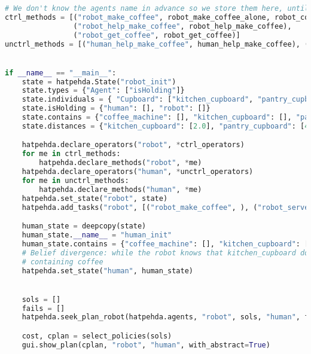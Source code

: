 \begin{lstlisting}[language=Python]
# We don't know the agents name in advance so we store them here, until we can add the proper agents
ctrl_methods = [("robot_make_coffee", robot_make_coffee_alone, robot_collaborate_make_coffee_no_comm, robot_collaborate_make_coffee_with_belief_update),
                ("robot_help_make_coffee", robot_help_make_coffee),
                ("robot_get_coffee", robot_get_coffee)]
unctrl_methods = [("human_help_make_coffee", human_help_make_coffee), ("human_get_coffee", human_get_coffee)]


if __name__ == "__main__":
    state = hatpehda.State("robot_init")
    state.types = {"Agent": ["isHolding"]}
    state.individuals = { "Cupboard": ["kitchen_cupboard", "pantry_cupboard"]}
    state.isHolding = {"human": [], "robot": []}
    state.contains = {"coffee_machine": [], "kitchen_cupboard": [], "pantry_cupboard": ["coffee"]}
    state.distances = {"kitchen_cupboard": [2.0], "pantry_cupboard": [4.0]}

    hatpehda.declare_operators("robot", *ctrl_operators)
    for me in ctrl_methods:
        hatpehda.declare_methods("robot", *me)
    hatpehda.declare_operators("human", *unctrl_operators)
    for me in unctrl_methods:
        hatpehda.declare_methods("human", *me)
    hatpehda.set_state("robot", state)
    hatpehda.add_tasks("robot", [("robot_make_coffee", ), ("robot_serve_coffee", )])  # Agenda initialization

    human_state = deepcopy(state)
    human_state.__name__ = "human_init"
    human_state.contains = {"coffee_machine": [], "kitchen_cupboard": ["coffee"], "pantry_cupboard": ["coffee"]}
    # Belief divergence: while the robot knows that kitchen_cupboard does not contain anything, the human thinks it is
    # containing coffee
    hatpehda.set_state("human", human_state)


    sols = []
    fails = []
    hatpehda.seek_plan_robot(hatpehda.agents, "robot", sols, "human", fails)

    cost, cplan = select_policies(sols)
    gui.show_plan(cplan, "robot", "human", with_abstract=True)
\end{lstlisting}

